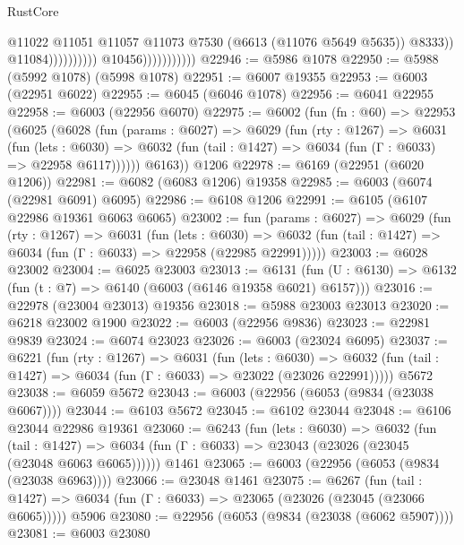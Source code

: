 \begin{lexlean}{RustCore}
\begin{coremodule}
                                                  @11022
                                                  @11051
                                                  @11057
                                                  @11073
                                                  @7530
                                                  (@6613 (@11076 @5649 @5635))
                                                  @8333))
                                              @11084))))))))))
                          @10456)))))))))))
@22946 := @5986 @1078
@22950 := @5988 (@5992 @1078) (@5998 @1078)
@22951 := @6007 @19355
@22953 := @6003 (@22951 @6022)
@22955 := @6045 (@6046 @1078)
@22956 := @6041 @22955
@22958 := @6003 (@22956 @6070)
@22975 := @6002
    (fun (fn : @60) =>
    @22953
      (@6025
        (@6028
          (fun (params : @6027) =>
          @6029
            (fun (rty : @1267) =>
            @6031
              (fun (lets : @6030) =>
              @6032 (fun (tail : @1427) => @6034 (fun (Γ : @6033) => @22958 @6117))))))
        @6163))
    @1206
@22978 := @6169 (@22951 (@6020 @1206))
@22981 := @6082 (@6083 @1206) @19358
@22985 := @6003 (@6074 (@22981 @6091) @6095)
@22986 := @6108 @1206
@22991 := @6105 (@6107 @22986 @19361 @6063 @6065)
@23002 := fun (params : @6027) =>
  @6029
    (fun (rty : @1267) =>
    @6031
      (fun (lets : @6030) =>
      @6032 (fun (tail : @1427) => @6034 (fun (Γ : @6033) => @22958 (@22985 @22991)))))
@23003 := @6028 @23002
@23004 := @6025 @23003
@23013 := @6131
    (fun (U : @6130) => @6132 (fun (t : @7) => @6140 (@6003 (@6146 @19358 @6021) @6157)))
@23016 := @22978 (@23004 @23013) @19356
@23018 := @5988 @23003 @23013
@23020 := @6218 @23002 @1900
@23022 := @6003 (@22956 @9836)
@23023 := @22981 @9839
@23024 := @6074 @23023
@23026 := @6003 (@23024 @6095)
@23037 := @6221
    (fun (rty : @1267) =>
    @6031
      (fun (lets : @6030) =>
      @6032 (fun (tail : @1427) => @6034 (fun (Γ : @6033) => @23022 (@23026 @22991)))))
    @5672
@23038 := @6059 @5672
@23043 := @6003 (@22956 (@6053 (@9834 (@23038 @6067))))
@23044 := @6103 @5672
@23045 := @6102 @23044
@23048 := @6106 @23044 @22986 @19361
@23060 := @6243
    (fun (lets : @6030) =>
    @6032
      (fun (tail : @1427) =>
      @6034 (fun (Γ : @6033) => @23043 (@23026 (@23045 (@23048 @6063 @6065))))))
    @1461
@23065 := @6003 (@22956 (@6053 (@9834 (@23038 @6963))))
@23066 := @23048 @1461
@23075 := @6267
    (fun (tail : @1427) => @6034 (fun (Γ : @6033) => @23065 (@23026 (@23045 (@23066 @6065)))))
    @5906
@23080 := @22956 (@6053 (@9834 (@23038 (@6062 @5907))))
@23081 := @6003 @23080

\end{coremodule}
\end{lexlean}
